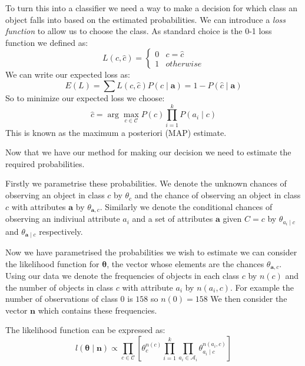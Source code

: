 To turn this into a classifier we need a way to make a decision for which class an object falls into based on the estimated probabilities.
We can introduce a \textit{loss function} to allow us to choose the class.
As standard choice is the 0-1 loss function we defined as:
\begin{equation}
	L(c, \hat{c}) = 
	\begin{cases}
		0 & c = \hat{c} \\
		1 & otherwise
	\end{cases}
\end{equation}
We can write our expected loss as:
\begin{equation}
	E(L) = \sum L(c, \hat{c})P(c \mid \mathbf{a}) = 1 - P(\hat{c} \mid \mathbf{a})
\end{equation}
So to minimize our expected loss we choose:
\begin{equation}
	\hat c = \arg\max_{c \in \mathcal{C}} P(c)\prod_{i=1}^{k}P(a_i \mid c)
\end{equation}
This is known as the maximum a posteriori (MAP) estimate.

Now that we have our method for making our decision we need to estimate the required probabilities.

Firstly we parametrise these probabilities.
We denote the unknown chances of observing an object in class $c$ by $\theta_c$ and the chance of observing an object in class $c$ with attributes $\mathbf{a}$ by $\theta_{\mathbf{a}, c}$.
Similarly we denote the conditional chances of observing an indiviual attribute $a_i$ and a set of attributes $\mathbf{a}$ given $C=c$ by $\theta_{a_i \mid c}$ and $\theta_{\mathbf{a} \mid c}$ respectively.

Now we have parametrised the probabilities we wish to estimate we can consider the likelihood function for $\mathbf{\theta}$, the vector whose elements are the chances $\theta_{\mathbf{a}, c}$.
Using our data we denote the frequencies of objects in each class $c$ by $n(c)$ and the number of objects in class $c$ with attribute $a_i$ by $n(a_i, c)$.
For example the number of observations of class $0$ is $158$ so $n(0) = 158$
We then consider the vector $\mathbf{n}$ which contains these frequencies.

The likelihood function can be expressed as:
\begin{equation} \label{likelihood}
	l(\mathbf{\theta} \mid \mathbf{n}) \propto \prod_{c \in \mathcal{C}} \left[ \theta_c^{n(c)} \prod_{i=1}^k \prod_{a_i \in \mathcal{A}_i} \theta_{a_i \mid c}^{n(a_i, c)} \right]
\end{equation}

